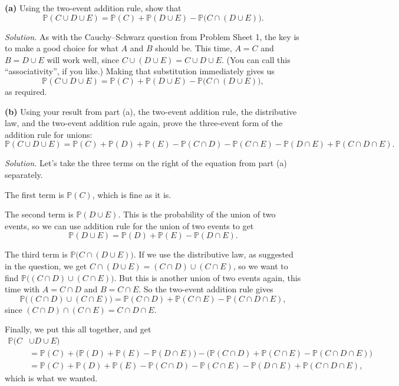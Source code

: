 \documentclass[
  a4paper,
]{book}
\theoremstyle{definition}
\theoremstyle{definition}
\theoremstyle{definition}
\theoremstyle{definition}
\theoremstyle{remark}
\begin{document}
\textbf{(a)} Using the two-event addition rule, show that
\[ \mathbb P(C \cup D \cup E) = \mathbb P(C) + \mathbb P(D \cup E) - \mathbb P\big(C \cap (D \cup E)\big).  \]

\begin{myanswers}
\emph{Solution.} As with the Cauchy--Schwarz question from Problem Sheet 1, the key is to make a good choice for what \(A\) and \(B\) should be. This time, \(A = C\) and \(B = D \cup E\) will work well, since \(C \cup (D \cup E) = C \cup D \cup E\). (You can call this ``associativity'', if you like.) Making that substitution immediately gives us
\[ \mathbb P(C \cup D \cup E) = \mathbb P(C) + \mathbb P(D \cup E) - \mathbb P\big(C \cap (D \cup E)\big) ,  \]
as required.

\end{myanswers}

\textbf{(b)} Using your result from part (a), the two-event addition rule, the distributive law, and the two-event addition rule again, prove the three-event form of the addition rule for unions:
\[
  \mathbb P(C \cup D \cup E) = \mathbb P(C) + \mathbb P(D) + \mathbb P(E) 
  - \mathbb P(C \cap D) - \mathbb P(C \cap E) - \mathbb P(D \cap E) + \mathbb P(C \cap D \cap E) .
\]

\begin{myanswers}
\emph{Solution.}
Let's take the three terms on the right of the equation from part (a) separately.

The first term is \(\mathbb P(C)\), which is fine as it is.

The second term is \(\mathbb P(D \cup E)\). This is the probability of the union of two events, so we can use addition rule for the union of two events to get
\[ \mathbb P(D \cup E) = \mathbb P(D) + \mathbb P(E) - \mathbb P(D \cap E) . \]

The third term is \(\mathbb P\big(C \cap (D \cup E)\big)\). If we use the distributive law, as suggested in the question, we get \(C \cap (D \cup E) = (C \cap D) \cup (C\cap E)\), so we want to find \(\mathbb P\big((C \cap D) \cup (C\cap E)\big)\). But this is another union of two events again, this time with \(A = C \cap D\) and \(B = C \cap E\). So the two-event addition rule gives
\[ \mathbb P\big((C \cap D) \cup (C\cap E)\big) = \mathbb P(C \cap D) + \mathbb P(C \cap E) - \mathbb P(C \cap D \cap E) , \]
since \((C \cap D) \cap (C \cap E) = C \cap D \cap E\).

Finally, we put this all together, and get
\begin{align*}
  \mathbb P(C &\cup D \cup E) \\
  &= \mathbb P(C) + \big(\mathbb P(D) + \mathbb P(E) - \mathbb P(D \cap E)\big) - \big(\mathbb P(C \cap D) + \mathbb P(C \cap E) - \mathbb P(C \cap D \cap E)\big) \\
  &= \mathbb P(C) + \mathbb P(D) + \mathbb P(E) - \mathbb P(C \cap D) - \mathbb P(C \cap E) - \mathbb P(D \cap E) + \mathbb P(C \cap D \cap E) , 
\end{align*}
which is what we wanted.

\end{myanswers}
\end{document}
